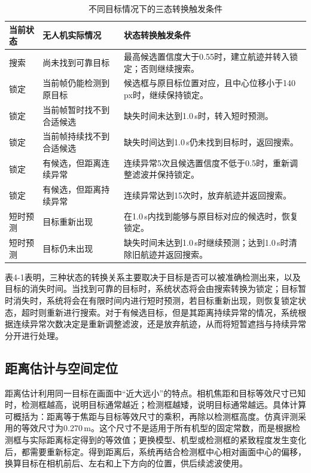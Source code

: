\begin{table}[htbp]
\centering
\caption{不同目标情况下的三态转换触发条件}
\label{tab:ch4-state-transition}
\small
\renewcommand{\arraystretch}{1.4}
\setlength{\tabcolsep}{6pt}
\begin{tabularx}{\textwidth}{>{\centering\arraybackslash}p{}>{\raggedright\arraybackslash}p{}>{\raggedright\arraybackslash}X}
\toprule
当前状态 & 无人机实际情况 & 状态转换触发条件 \\
\midrule
搜索 & 尚未找到可靠目标 & 最高候选置信度大于0.55时，建立航迹并转入锁定；否则继续搜索。 \\
锁定 & 当前帧仍能检测到原目标 & 候选框与原目标位置对应，且中心位移小于140\,px时，继续保持锁定。 \\
锁定 & 当前帧暂时找不到合适候选 & 缺失时间未达到1.0\,s时，转入短时预测。 \\
锁定 & 当前帧持续找不到合适候选 & 缺失时间达到1.0\,s仍未找到目标时，返回搜索。 \\
锁定 & 有候选，但距离连续异常 & 连续异常5次且候选置信度不低于0.5时，重新调整滤波并保持锁定。 \\
锁定 & 有候选，但距离持续异常 & 连续异常达到15次时，放弃航迹并返回搜索。 \\
短时预测 & 目标重新出现 & 在1.0\,s内找到能够与原目标对应的候选时，恢复锁定。 \\
短时预测 & 目标仍未出现 & 缺失时间未达到1.0\,s时继续预测；达到1.0\,s时清除旧航迹并返回搜索。 \\
\bottomrule
\end{tabularx}
\end{table}

表4-1表明，三种状态的转换关系主要取决于目标是否可以被准确检测出来，以及目标的消失时间。当找到可靠的目标时，系统状态将会由搜索转换为锁定；目标暂时消失时，系统将会在有限时间内进行短时预测，若目标重新出现，则恢复锁定状态，超时则重新进行搜索。对于有候选目标，但是其距离持续异常的情况，系统根据连续异常次数决定是重新调整滤波，还是放弃航迹，从而将短暂遮挡与持续异常分开进行处理。

\subsection{距离估计与空间定位}

距离估计利用同一目标在画面中“近大远小”的特点。相机焦距和目标等效尺寸已知时，检测框越高，说明目标通常越近；检测框越矮，说明目标通常越远。具体计算可概括为：距离等于焦距与目标等效尺寸的乘积，再除以检测框高度。仿真评测采用的等效尺寸为0.270\,m。这个尺寸不是适用于所有机型的固定常数，而是根据检测框与实际距离标定得到的等效值；更换模型、机型或检测框的紧致程度发生变化后，都需要重新标定。得到距离后，系统再结合检测框中心相对画面中心的偏移，换算目标在相机前后、左右和上下方向的位置，供后续滤波使用。

